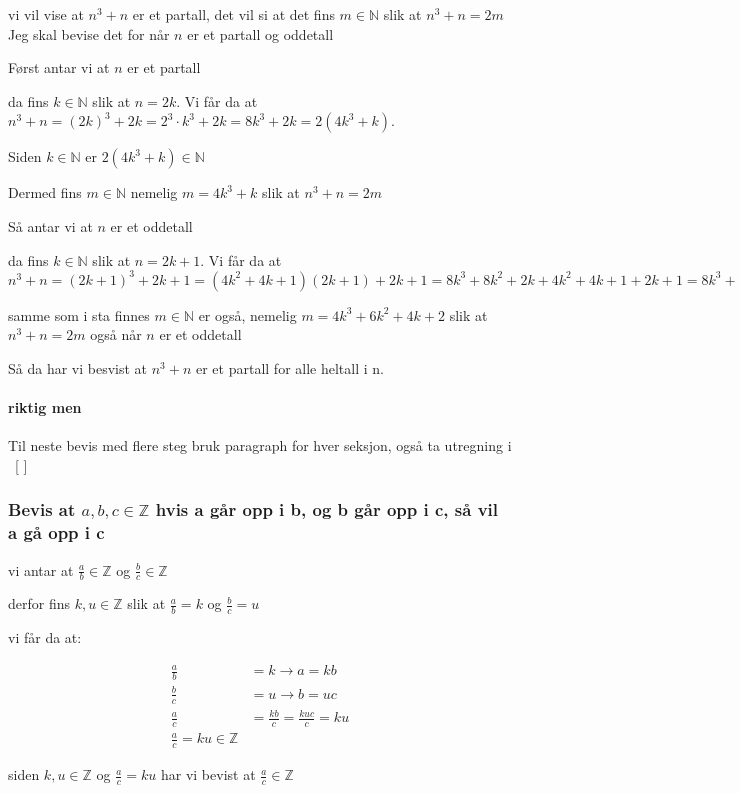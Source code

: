 \documentclass{article}
\begin{document}
vi vil vise at $n^3+n$ er et partall, det vil si at det fins $m \in \mathbb{N}$ slik at $n^3+n=2m$
Jeg skal bevise det for når $n$ er et partall og oddetall

Først antar vi at $n$ er et partall

da fins $k \in \mathbb{N}$ slik at $n=2k$. Vi får da at $n^3+n=(2k)^3+2k=2^3 \cdot k^3+2k=8k^3+2k=2(4k^3+k)$.

Siden $k \in \mathbb{N}$ er $2(4k^3+k) \in \mathbb{N}$

Dermed fins $m \in \mathbb{N}$ nemelig $m=4k^3+k$ slik at $n^3+n=2m$

Så antar vi at $n$ er et oddetall

da fins $k \in \mathbb{N}$ slik at $n=2k+1$. Vi får da at $n^3+n=(2k+1)^3+2k+1=(4k^2+4k+1)(2k+1)+2k+1=8k^3+8k^2+2k+4k^2+4k+1+2k+1=8k^3+12k^2+8k+2=2(4k^3+6k^2+4k+1)$

samme som i sta finnes $m \in \mathbb{N}$ er også, nemelig $m=4k^3+6k^2+4k+2$ slik at $n^3+n=2m$ også når $n$ er et oddetall

Så da har vi besvist at $n^3+n$ er et partall for alle heltall i n.

\paragraph{riktig men}

Til neste bevis med flere steg bruk paragraph for hver seksjon, også ta utregning i \ [ ] \

\subsubsection{Bevis at $a,b,c \in \mathbb{Z}$ hvis a går opp i b, og b går opp i c, så vil a gå opp i c }

vi antar at $\frac{a}{b} \in \mathbb{Z}$ og $\frac{b}{c} \in \mathbb{Z}$

derfor fins $k, u \in \mathbb{Z}$ slik at $\frac{a}{b}=k$ og $\frac{b}{c}=u$

vi får da at:

\begin{align*}
    \frac{a}{b} &= k \rightarrow a = kb \\
    \frac{b}{c} &= u \rightarrow b = uc \\
    \frac{a}{c} &= \frac{kb}{c} = \frac{kuc}{c}=ku \\
    \frac{a}{c}=ku \in \mathbb{Z}
\end{align*}

siden $k,u \in \mathbb{Z}$ og $\frac{a}{c}=ku$ har vi bevist at $\frac{a}{c} \in \mathbb{Z}$
\end{document}
